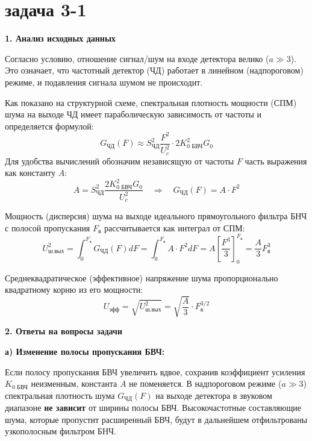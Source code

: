\section{задача 3-1}

\vspace{1em}
\textbf{1. Анализ исходных данных}

Согласно условию, отношение сигнал/шум на входе детектора велико ($a \gg 3$). Это означает, что частотный детектор (ЧД) работает в линейном (надпороговом) режиме, и подавления сигнала шумом не происходит.

Как показано на структурной схеме, спектральная плотность мощности (СПМ) шума на выходе ЧД имеет параболическую зависимость от частоты и определяется формулой:
\begin{equation*}
G_{\text{ЧД}}(F) \approx S_{\text{ЧД}}^2 \frac{F^2}{U_c^2} \cdot 2K_{0 \text{ БВЧ}}^2 G_0
\end{equation*}
Для удобства вычислений обозначим независящую от частоты $F$ часть выражения как константу $A$:
\begin{equation*}
A = S_{\text{ЧД}}^2 \frac{2K_{0 \text{ БВЧ}}^2 G_0}{U_c^2} \quad \Rightarrow \quad G_{\text{ЧД}}(F) = A \cdot F^2
\end{equation*}

Мощность (дисперсия) шума на выходе идеального прямоугольного фильтра БНЧ с полосой пропускания $F_{\text{в}}$ рассчитывается как интеграл от СПМ:
\begin{equation*}
U_{\text{ш.вых}}^2 = \int_0^{F_{\text{в}}} G_{\text{ЧД}}(F) dF = \int_0^{F_{\text{в}}} A \cdot F^2 dF = A \left[ \frac{F^3}{3} \right]_0^{F_{\text{в}}} = \frac{A}{3} F_{\text{в}}^3
\end{equation*}

Среднеквадратическое (эффективное) напряжение шума пропорционально квадратному корню из его мощности:
\begin{equation*}
U_{\text{эфф}} = \sqrt{U_{\text{ш.вых}}^2} = \sqrt{\frac{A}{3}} \cdot F_{\text{в}}^{3/2}
\end{equation*}

\vspace{1em}
\textbf{2. Ответы на вопросы задачи}

\textbf{а) Изменение полосы пропускания БВЧ:}

Если полосу пропускания БВЧ увеличить вдвое, сохранив коэффициент усиления $K_{0 \text{ БВЧ}}$ неизменным, константа $A$ не поменяется. В надпороговом режиме ($a \gg 3$) спектральная плотность шума $G_{\text{ЧД}}(F)$ на выходе детектора в звуковом диапазоне \textbf{не зависит} от ширины полосы БВЧ. Высокочастотные составляющие шума, которые пропустит расширенный БВЧ, будут в дальнейшем отфильтрованы узкополосным фильтром БНЧ.

